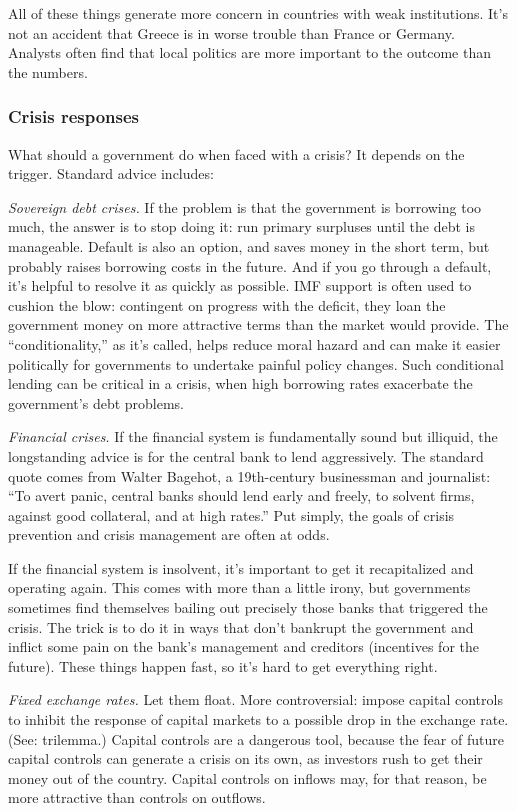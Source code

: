 \documentclass[letterpaper,12pt]{article}
\begin{document}
All of these things generate more concern
in countries with weak institutions.
It's not an accident that Greece is in worse trouble
than France or Germany.
Analysts often find that local politics are more important
to the outcome than the numbers.

\subsubsection*{Crisis responses}

What should a government do when faced with a crisis?
It depends on the trigger.
Standard advice includes:

{\it Sovereign debt crises.\/}
If the problem is that the government is borrowing too much,
the answer is to stop doing it:
run primary surpluses until the debt is manageable.
Default is also an option, and saves money in the short term,
but probably raises borrowing costs in the future.
And if you go through a default, it's helpful to resolve it as quickly as possible. 
IMF support is often used to cushion the blow:
contingent on progress with the deficit,
they loan the government money on more attractive terms
than the market would provide.
The ``conditionality,'' as it's called,
helps reduce moral hazard and can make it easier politically
for governments to undertake painful policy changes.
Such conditional lending can be critical in a crisis,
when high borrowing rates exacerbate the government's debt problems.

{\it Financial crises.\/}
If the financial system is fundamentally sound but illiquid,
the longstanding advice is for the central bank to lend
aggressively.
The standard quote comes from Walter Bagehot,
a 19th-century businessman and journalist:
``To avert panic, central banks should lend early and freely,
to solvent firms, against good collateral, and at high rates.''
Put simply,
the goals of crisis prevention and crisis management
are often at odds.


If the financial system is insolvent,
it's important to get it recapitalized and operating again.
This comes with more than a little irony,
but governments sometimes find themselves bailing out
precisely those banks that triggered the crisis.
The trick is to do it in ways that don't bankrupt the
government and inflict some pain on the bank's management and creditors
(incentives for the future).
These things happen fast, so it's hard to get everything right.

{\it Fixed exchange rates.\/}
Let them float.
More controversial:  impose capital controls to inhibit the
response of capital markets to a possible drop in the exchange rate.
(See:  trilemma.)
Capital controls are a dangerous tool,
because the fear of future capital controls
can generate a crisis on its own,
as investors rush to get their money out of the country.
Capital controls on inflows may, for that reason, be more attractive
than controls on outflows.
\end{document}
